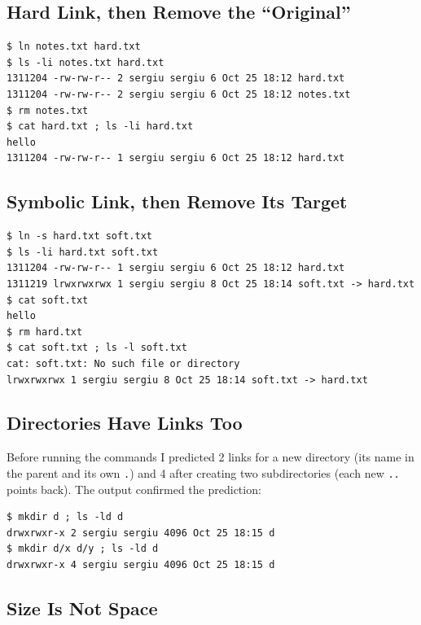 \documentclass[12pt,a4paper]{article}
\begin{document}
\subsection{Hard Link, then Remove the ``Original''}

\begin{lstlisting}[style=terminal,caption={Two names for one inode}]
$ ln notes.txt hard.txt
$ ls -li notes.txt hard.txt
1311204 -rw-rw-r-- 2 sergiu sergiu 6 Oct 25 18:12 hard.txt
1311204 -rw-rw-r-- 2 sergiu sergiu 6 Oct 25 18:12 notes.txt
$ rm notes.txt
$ cat hard.txt ; ls -li hard.txt
hello
1311204 -rw-rw-r-- 1 sergiu sergiu 6 Oct 25 18:12 hard.txt
\end{lstlisting}

\subsection{Symbolic Link, then Remove Its Target}

\begin{lstlisting}[style=terminal,caption={A symbolic link becomes dangling}]
$ ln -s hard.txt soft.txt
$ ls -li hard.txt soft.txt
1311204 -rw-rw-r-- 1 sergiu sergiu 6 Oct 25 18:12 hard.txt
1311219 lrwxrwxrwx 1 sergiu sergiu 8 Oct 25 18:14 soft.txt -> hard.txt
$ cat soft.txt
hello
$ rm hard.txt
$ cat soft.txt ; ls -l soft.txt
cat: soft.txt: No such file or directory
lrwxrwxrwx 1 sergiu sergiu 8 Oct 25 18:14 soft.txt -> hard.txt
\end{lstlisting}

\subsection{Directories Have Links Too}

Before running the commands I predicted 2 links for a new directory (its name in the parent and its own \texttt{.}) and 4 after creating two subdirectories (each new \texttt{..} points back). The output confirmed the prediction:

\begin{lstlisting}[style=terminal,caption={Link count of a directory}]
$ mkdir d ; ls -ld d
drwxrwxr-x 2 sergiu sergiu 4096 Oct 25 18:15 d
$ mkdir d/x d/y ; ls -ld d
drwxrwxr-x 4 sergiu sergiu 4096 Oct 25 18:15 d
\end{lstlisting}

\subsection{Size Is Not Space}
\end{document}
